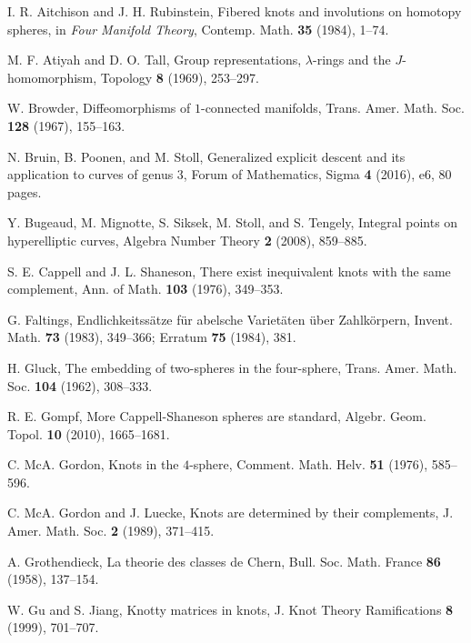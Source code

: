 \documentclass{amsart}
\theoremstyle{plain}
\theoremstyle{definition}
\theoremstyle{remark}
\begin{document}
\begin{thebibliography}{99}

\begin{footnotesize}%

I. R. Aitchison and J. H. Rubinstein, 
Fibered knots and involutions on homotopy spheres, 
in {\it Four Manifold Theory}, 
Contemp. Math. {\bf 35} (1984), 1--74. 

M. F. Atiyah and D. O. Tall, 
Group representations, $\lambda$-rings and the $J$-homomorphism, 
Topology {\bf 8} (1969), 253--297. 

W. Browder, 
Diffeomorphisms of $1$-connected manifolds, 
Trans. Amer. Math. Soc. {\bf 128} (1967), 155--163. 

N. Bruin, B. Poonen, and M. Stoll, 
Generalized explicit descent and its application to curves of genus $3$, 
Forum of Mathematics, Sigma {\bf 4} (2016), e6, 80 pages. 

Y. Bugeaud, M. Mignotte, S. Siksek, M. Stoll, and S. Tengely, 
Integral points on hyperelliptic curves, 
Algebra Number Theory {\bf 2} (2008), 859--885. 

S. E. Cappell and J. L. Shaneson, 
There exist inequivalent knots with the same complement, 
Ann. of Math. {\bf 103} (1976), 349--353. 

G. Faltings, 
Endlichkeitss\"{a}tze f\"{u}r abelsche Variet\"{a}ten \"{u}ber Zahlk\"{o}rpern, 
Invent. Math. {\bf 73} (1983), 349--366; 
Erratum {\bf 75} (1984), 381. 

H. Gluck, 
The embedding of two-spheres in the four-sphere, 
Trans. Amer. Math. Soc. {\bf 104} (1962), 308--333. 

R. E. Gompf, 
More Cappell-Shaneson spheres are standard, 
Algebr. Geom. Topol. {\bf 10} (2010), 1665--1681. 

C. McA. Gordon, 
Knots in the $4$-sphere, 
Comment. Math. Helv. {\bf 51} (1976), 585--596. 

C. McA. Gordon and J. Luecke, 
Knots are determined by their complements, 
J. Amer. Math. Soc. {\bf 2} (1989), 371--415. 

A. Grothendieck, 
La theorie des classes de Chern, 
Bull. Soc. Math. France {\bf 86} (1958), 137--154. 

W. Gu and S. Jiang, 
Knotty matrices in knots, 
J. Knot Theory Ramifications {\bf 8} (1999), 701--707. 


\end{footnotesize}
\end{thebibliography}
\end{document}
